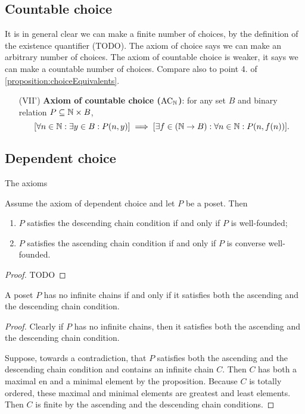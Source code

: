 \subsection{Countable choice}
It is in general clear we can make a finite number of choices, by the definition of the existence quantifier (TODO). The axiom of choice says we can make an arbitrary number of choices. The axiom of countable choice is weaker, it says we can make a countable number of choices. Compare also to point 4. of \ref{proposition:choiceEquivalents}.
\begin{enumerate}[(I)]
\setcounter{enumi}{6}
\item[(VII')] \textbf{Axiom of countable choice ($\text{AC}_{\mathbb{N}}$)}: for any set $B$ and binary relation $P\subseteq \mathbb{N}\times B$,
\[ [\forall n\in \mathbb{N}: \exists y\in B: P(n,y)] \implies [\exists f\in (\mathbb{N}\to B): \forall n \in \mathbb{N}: P(n,f(n))]. \]
\end{enumerate}

\subsection{Dependent choice}
The axioms

\begin{proposition} \label{prop:welfoundedACC}
Assume the axiom of dependent choice and let $P$ be a poset. Then
\begin{enumerate}
\item $P$ satisfies the descending chain condition \textup{if and only if} $P$ is well-founded;
\item $P$ satisfies the ascending chain condition \textup{if and only if} $P$ is converse well-founded.
\end{enumerate}
\end{proposition}
\begin{proof}
TODO
\end{proof}
\begin{corollary}
A poset $P$ has no infinite chains \textup{if and only if} it satisfies both the ascending and the descending chain condition.
\end{corollary}
\begin{proof}
Clearly if $P$ has no infinite chains, then it satisfies both the ascending and the descending chain condition.

Suppose, towards a contradiction, that $P$ satisfies both the ascending and the descending chain condition and contains an infinite chain $C$. Then $C$ has both a maximal en and a minimal element by the proposition. Because $C$ is totally ordered, these maximal and minimal elements are greatest and least elements. Then $C$ is finite by the ascending and the descending chain conditions.
\end{proof}


